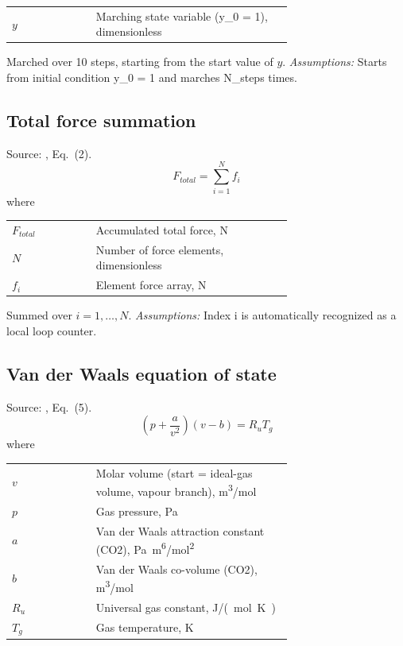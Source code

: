 \noindent\begin{tabular}{@{\quad}l@{\quad}p{0.7\linewidth}@{}}
  $y$ & Marching state variable (y\_0 = 1), dimensionless \\
\end{tabular}

\noindent Marched over 10 steps, starting from the start value of $y$. \textit{Assumptions:} Starts from initial condition y\_0 = 1 and marches N\_steps times.

\subsection{Total force summation}
Source: \cite{refb}, Eq.~(2).
\begin{equation}
  F_{total} = \sum_{i=1}^{N} f_i
  \label{eq:total-force-summation}
\end{equation}
\noindent where

\noindent\begin{tabular}{@{\quad}l@{\quad}p{0.7\linewidth}@{}}
  $F_{total}$ & Accumulated total force, \si{N} \\
  $N$ & Number of force elements, dimensionless \\
  $f_i$ & Element force array, \si{N} \\
\end{tabular}

\noindent Summed over $i = 1, \dots, N$. \textit{Assumptions:} Index i is automatically recognized as a local loop counter.

\subsection{Van der Waals equation of state}
Source: \cite{van1873}, Eq.~(5).
\begin{equation}
  \left(p + \frac{a}{v^2}\right)\left(v - b\right) = R_u T_g
  \label{eq:van-der-waals-equation-of-state}
\end{equation}
\noindent where

\noindent\begin{tabular}{@{\quad}l@{\quad}p{0.7\linewidth}@{}}
  $v$ & Molar volume (start = ideal-gas volume, vapour branch), \si{m^{3}/mol} \\
  $p$ & Gas pressure, \si{Pa} \\
  $a$ & Van der Waals attraction constant (CO2), \si{Pa.m^{6}/mol^{2}} \\
  $b$ & Van der Waals co-volume (CO2), \si{m^{3}/mol} \\
  $R_u$ & Universal gas constant, \si{J/(mol.K)} \\
  $T_g$ & Gas temperature, \si{K} \\
\end{tabular}

